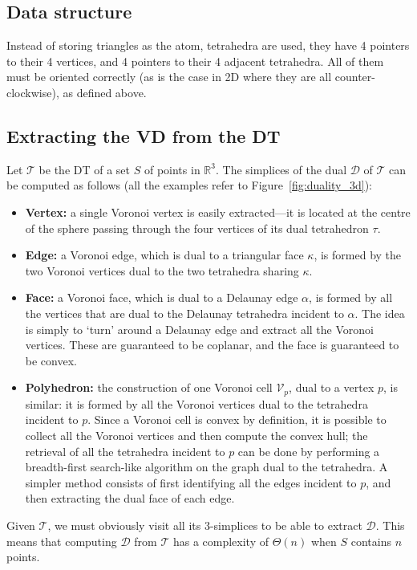 \subsection{Data structure} Instead of storing triangles as the atom, tetrahedra are used, they have 4 pointers to their 4 vertices, and 4 pointers to their 4 adjacent tetrahedra.
All of them must be oriented correctly (as is the case in 2D where they are all counter-clockwise), as defined above.


\subsection{Extracting the VD from the DT}%
\label{sec:extraction_vddt}

Let $\mathcal{T}$ be the DT of a set $S$ of points in $\mathbb{R}^3$. 
The simplices of the dual $\mathcal{D}$ of $\mathcal{T}$ can be computed as follows (all the examples refer to Figure~\ref{fig:duality_3d}):
\begin{itemize}
  \item \textbf{Vertex:} a single Voronoi vertex is easily extracted---it is located at the centre of the sphere passing through the four vertices of its dual tetrahedron $\tau$.
  \item \textbf{Edge:} a Voronoi edge, which is dual to a triangular face $\kappa$, is formed by the two Voronoi vertices dual to the two tetrahedra sharing $\kappa$.
  \item \textbf{Face:} a Voronoi face, which is dual to a Delaunay edge $\alpha$, is formed by all the vertices that are dual to the Delaunay tetrahedra incident to $\alpha$. The idea is simply to `turn' around a Delaunay edge and extract all the Voronoi vertices. These are guaranteed to be coplanar, and the face is guaranteed to be convex.
  \item \textbf{Polyhedron:} the construction of one Voronoi cell $\mathcal{V}_{p}$, dual to a vertex $p$, is similar: it is formed by all the Voronoi vertices dual to the tetrahedra incident to $p$. Since a Voronoi cell is convex by definition, it is possible to collect all the Voronoi vertices and then compute the convex hull; the retrieval of all the tetrahedra incident to $p$ can be done by performing a breadth-first search-like algorithm on the graph dual to the tetrahedra. A simpler method consists of first identifying all the edges incident to $p$, and then extracting the dual face of each edge.
\end{itemize}
Given $\mathcal{T}$, we must obviously visit all its 3-simplices to be able to extract $\mathcal{D}$. This means that computing $\mathcal{D}$ from $\mathcal{T}$ has a complexity of $\Theta(n)$ when $S$ contains $n$ points.





